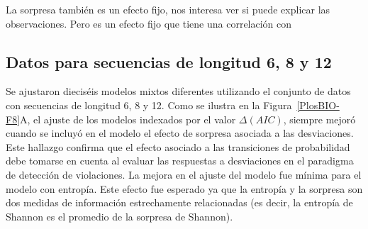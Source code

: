 
La sorpresa también es un efecto fijo, nos interesa ver si puede explicar las observaciones. Pero es un efecto fijo que tiene una correlación con 

\subsection{Datos para secuencias de longitud 6, 8 y 12}


Se ajustaron dieciséis modelos mixtos diferentes utilizando el conjunto de datos con secuencias de longitud 6, 8 y 12. Como se ilustra en la Figura~\ref{PlosBIO-F8}A, el ajuste de los modelos indexados por el valor $\Delta (AIC)$, siempre mejoró cuando se incluyó en el modelo el efecto de sorpresa asociada a las desviaciones. Este hallazgo confirma que el efecto asociado a las transiciones de probabilidad debe tomarse en cuenta al evaluar las respuestas a desviaciones en el paradigma de detección de violaciones. La mejora en el ajuste del modelo fue mínima para el modelo con entropía. Este efecto fue esperado ya que la entropía y la sorpresa son dos medidas de información estrechamente relacionadas (es decir, la entropía de Shannon es el promedio de la sorpresa de Shannon).

